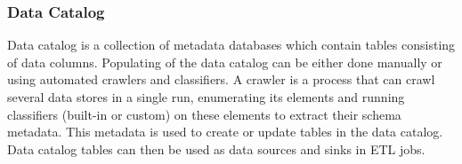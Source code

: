 \subsubsection{Data Catalog}
Data catalog is a collection of metadata databases which contain tables consisting of data columns. Populating of the data catalog can be either done manually or using automated crawlers and classifiers. A crawler is a process that can crawl several data stores in a single run, enumerating its elements and running classifiers (built-in or custom) on these elements to extract their schema metadata. This metadata is used to create or update tables in the data catalog. Data catalog tables can then be used as data sources and sinks in ETL jobs.
